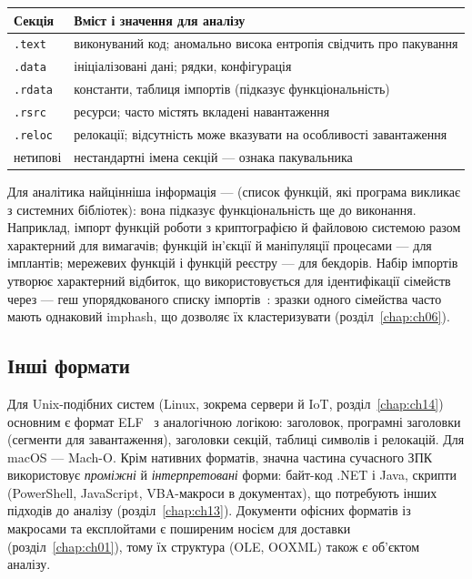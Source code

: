 \begin{center}\footnotesize
\begin{tabularx}{\linewidth}{L{16mm} Y}
\toprule
Секція & Вміст і значення для аналізу \\
\midrule
\texttt{.text} & виконуваний код; аномально висока ентропія свідчить про пакування \\
\texttt{.data} & ініціалізовані дані; рядки, конфігурація \\
\texttt{.rdata} & константи, таблиця імпортів (підказує функціональність) \\
\texttt{.rsrc} & ресурси; часто містять вкладені навантаження \\
\texttt{.reloc} & релокації; відсутність може вказувати на особливості завантаження \\
нетипові & нестандартні імена секцій --- ознака пакувальника \\
\bottomrule
\end{tabularx}
\end{center}

Для аналітика найцінніша інформація ---  (список функцій, які програма викликає з системних бібліотек): вона підказує функціональність ще до виконання. Наприклад, імпорт функцій роботи з криптографією й файловою системою разом характерний для вимагачів; функцій ін'єкції й маніпуляції процесами --- для імплантів; мережевих функцій і функцій реєстру --- для бекдорів. Набір імпортів утворює характерний відбиток, що використовується для ідентифікації сімейств через  --- геш упорядкованого списку імпортів~\cite{ch05:imphash}: зразки одного сімейства часто мають однаковий imphash, що дозволяє їх кластеризувати (розділ~\ref{chap:ch06}).

\subsection{Інші формати}

Для Unix-подібних систем (Linux, зокрема сервери й IoT, розділ~\ref{chap:ch14}) основним є формат ELF~\cite{ch05:elf} з аналогічною логікою: заголовок, програмні заголовки (сегменти для завантаження), заголовки секцій, таблиці символів і релокацій. Для macOS --- Mach-O. Крім нативних форматів, значна частина сучасного ЗПК використовує \emph{проміжні} й \emph{інтерпретовані} форми: байт-код .NET і Java, скрипти (PowerShell, JavaScript, VBA-макроси в документах), що потребують інших підходів до аналізу (розділ~\ref{chap:ch13}). Документи офісних форматів із макросами та експлойтами є поширеним носієм для доставки (розділ~\ref{chap:ch01}), тому їх структура (OLE, OOXML) також є об'єктом аналізу.

